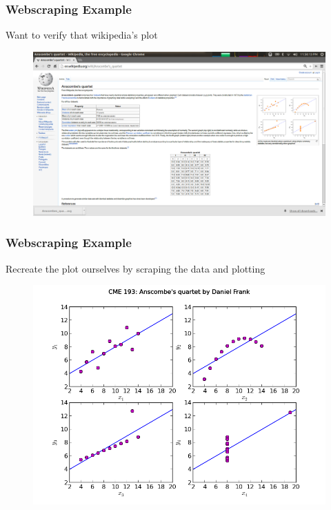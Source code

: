 \documentclass{beamer}
\begin{document}
\begin{frame}
\frametitle{Webscraping Example}
Want to verify that wikipedia's plot
\begin{figure}[h]
\centering
\includegraphics[width=.9\textwidth]{images/anscombe.png}
\end{figure}
\end{frame}

\begin{frame}
\frametitle{Webscraping Example}
Recreate the plot ourselves by scraping the data and plotting
\begin{figure}[h]
\centering
\includegraphics[width=.9\textwidth]{images/quartet.png}
\end{figure}
\end{frame}
\end{document}
